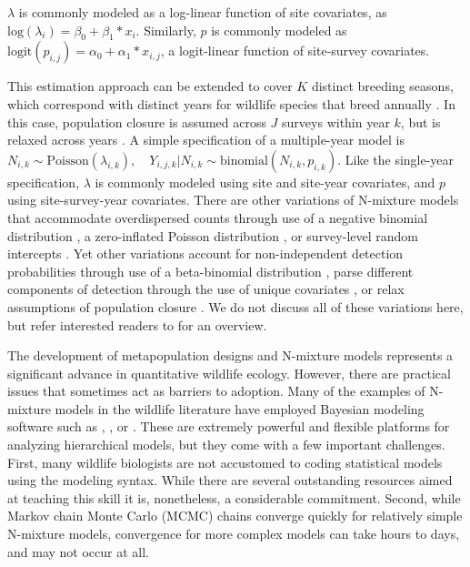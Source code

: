 \documentclass[article]{jss}
\begin{document}
$\lambda$ is commonly modeled as a log-linear function of site covariates, as $\text{log}(\lambda_i) = \beta_0 + \beta_1 * x_i$. Similarly, $p$ is commonly modeled as $\text{logit}(p_{i,j}) = \alpha_0 + \alpha_1 * x_{i,j}$, a logit-linear function of site-survey covariates.

This estimation approach can be extended to cover $K$ distinct breeding seasons, which correspond with distinct years for wildlife species that breed annually \citep{Kery_Dorazio_Soldaat_Van_Strien_Zuiderwijk_Royle_2009}. In this case, population closure is assumed across $J$ surveys within year $k$, but is relaxed across years \citep{Kery_Dorazio_Soldaat_Van_Strien_Zuiderwijk_Royle_2009}. A simple specification of a multiple-year model is $N_{i,k} \sim \text{Poisson}(\lambda_{i,k}), \quad Y_{i,j,k} | N_{i,k} \sim \text{binomial}(N_{i,k}, p_{i,k})$. Like the single-year specification, $\lambda$ is commonly modeled using site and site-year covariates, and $p$ using site-survey-year covariates. There are other variations of N-mixture models that accommodate overdispersed counts through use of a negative binomial distribution \citep{Kery_Royle_2010}, a zero-inflated Poisson distribution \citep{Wenger_Freeman_2008}, or survey-level random intercepts \citep{Kery_Schaub_2011}. Yet other variations account for non-independent detection probabilities through use of a beta-binomial distribution \citep{Martin_Royle_Mackenzie_Edwards_Kery_Gardner_2011}, parse different components of detection through the use of unique covariates \citep{O'Donnell_Thompson_III_Semlitsch_2015}, or relax assumptions of population closure \citep{Chandler_Royle_King_2011, Dail_Madsen_2011}. We do not discuss all of these variations here, but refer interested readers to \cite{Denes_Silveira_Beissinger_2015} for an overview.

The development of metapopulation designs and N-mixture models represents a significant advance in quantitative wildlife ecology. However, there are practical issues that sometimes act as barriers to adoption. Many of the examples of N-mixture models in the wildlife literature have employed Bayesian modeling software such as , , or  \citep{Lunn_Jackson_Best_Thomas_Spiegelhalter_2012}. These are extremely powerful and flexible platforms for analyzing hierarchical models, but they come with a few important challenges.  First, many wildlife biologists are not accustomed to coding statistical models using the  modeling syntax. While there are several outstanding resources aimed at teaching this skill \citep{Royle_Dorazio_2008, Kery_2010, Kery_Schaub_2011, Kery_Royle_2015} it is, nonetheless, a considerable commitment. Second, while Markov chain Monte Carlo (MCMC) chains converge quickly for relatively simple N-mixture models, convergence for more complex models can take hours to days, and may not occur at all.
\end{document}
